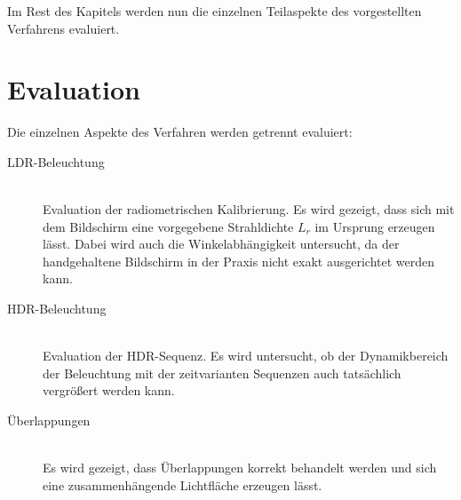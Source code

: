     Im Rest des Kapitels werden nun die einzelnen Teilaspekte des vorgestellten Verfahrens evaluiert.
 
%

 \section{Evaluation} \label{evaluation}
   
   Die einzelnen Aspekte des Verfahren werden getrennt evaluiert:

   \begin{description}
       \item[LDR-Beleuchtung] \hfill \\ 
          Evaluation der radiometrischen Kalibrierung. Es wird gezeigt, dass sich mit dem Bildschirm eine vorgegebene Strahldichte $L_r$ im Ursprung erzeugen lässt.
          Dabei wird auch die Winkelabhängigkeit untersucht, da der handgehaltene Bildschirm in der Praxis nicht exakt ausgerichtet werden kann.
       \item[HDR-Beleuchtung] \hfill \\ 
          Evaluation der HDR-Sequenz. Es wird untersucht, ob der Dynamikbereich der Beleuchtung mit der zeitvarianten Sequenzen auch tatsächlich vergrößert werden kann.
       \item[Überlappungen] \hfill \\ 
         Es wird gezeigt, dass Überlappungen korrekt behandelt werden und sich eine zusammenhängende Lichtfläche erzeugen lässt.
    \end{description}
 
